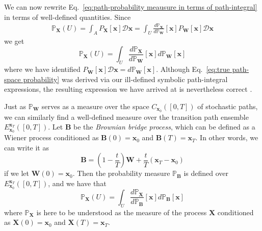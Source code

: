 We can now rewrite Eq.~\ref{eq:path-probability meausure in terms of path-integral} in terms of well-defined quantities. Since
\begin{equation}
\begin{aligned}
\mathbb{P}_\mathbf{X}(U)  =  \int_A P_\mathbf{X}[\mathbf{x}] \mathcal{D} \mathbf{x} 
 = \int_U \frac{d \mathbb{P}_\mathbf{X}}{d \mathbb{P}_\mathbf{W}}[\mathbf{x}] P_\mathbf{W}[\mathbf{x}] \mathcal{D} \mathbf{x} 
\end{aligned}
\end{equation}
we get
\begin{equation} \label{eq:true path-space probability}
\mathbb{P}_\mathbf{X}(U) = \int_U \frac{d \mathbb{P}_\mathbf{X}}{d \mathbb{P}_\mathbf{W}}[\mathbf{x}] d \mathbb{P}_\mathbf{W}[\mathbf{x}]
\end{equation}
where we have identified $P_\mathbf{W}[\mathbf{x}] \mathcal{D} \mathbf{x} = d \mathbb{P}_\mathbf{W}[\mathbf{x}]$. Although Eq.~\ref{eq:true path-space probability} was derived via our ill-defined symbolic path-integral expressions, the resulting expression we have arrived at is nevertheless correct \citep{beskosMCMCMETHODSDIFFUSION2008, hairerAnalysisSPDEsArising2005, hairerAnalysisSPDEsArising2007}.

Just as $\mathbb{P}_\mathbf{W}$ serves as a measure over the space $C_{\mathbf{x}_0}([0,T])$ of stochastic paths, we can similarly find a well-defined measure over the transition path ensemble $E_{\mathbf{x}_0}^{\mathbf{x}_T}([0,T])$. Let $\mathbf{B}$ be the \textit{Brownian bridge process}, which can be defined as a Wiener process conditioned as $\mathbf{B}(0) = \mathbf{x}_0$ and $\mathbf{B}(T) = \mathbf{x}_T$. In other words, we can write it as
\begin{equation}
	\mathbf{B} = \left(1 - \frac{t}{T}\right) \mathbf{W} + \frac{t}{T} (\mathbf{x}_T - \mathbf{x}_0)
\end{equation}
if we let $\mathbf{W}(0) = \mathbf{x}_0$. Then the probability measure $\mathbb{P}_\mathbf{B}$ is defined over $E_{\mathbf{x}_0}^{\mathbf{x}_T}([0,T])$, and we have that \citep{beskosMCMCMETHODSDIFFUSION2008}
\begin{equation} \label{eq:true path-space probability of TPE}
\mathbb{P}_\mathbf{X}(U) = \int_U \frac{d \mathbb{P}_\mathbf{X}}{d \mathbb{P}_\mathbf{B}}[\mathbf{x}] d \mathbb{P}_\mathbf{B}[\mathbf{x}]
\end{equation}
where $\mathbb{P}_\mathbf{X}$ is here to be understood as the measure of the process $\mathbf{X}$ conditioned as $\mathbf{X}(0) = \mathbf{x}_0$ and $\mathbf{X}(T) = \mathbf{x}_T$. 


